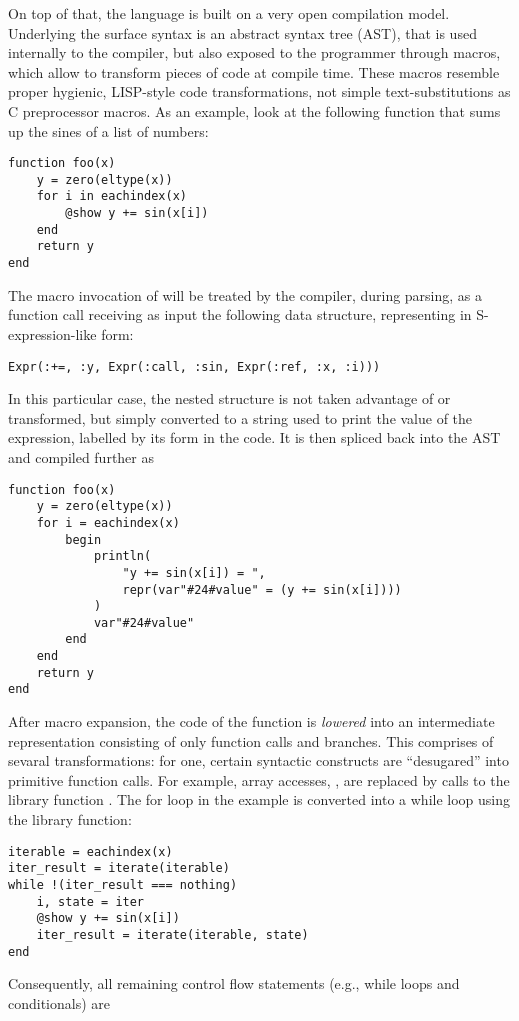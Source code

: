 On top of that, the language is built on a very open compilation model.  Underlying the surface
syntax is an abstract syntax tree (AST), that is used internally to the compiler, but also exposed
to the programmer through macros, which allow to transform pieces of code at compile time.  These
macros resemble proper hygienic, LISP-style code transformations, not simple text-substitutions as C
preprocessor macros.  As an example, look at the following function that sums up the sines of a list
of numbers:
\begin{lstlisting}
function foo(x)
    y = zero(eltype(x))
    for i in eachindex(x)
        @show y += sin(x[i])
    end
    return y
end
\end{lstlisting}
The macro invocation of  will be treated by the compiler, during parsing, as a function
call receiving as input the following data structure, representing  in
S-expression-like form:
\begin{lstlisting}
Expr(:+=, :y, Expr(:call, :sin, Expr(:ref, :x, :i)))
\end{lstlisting}
In this particular case, the nested structure is not taken advantage of or transformed, but simply
converted to a string used to print the value of the expression, labelled by its form in the code.
It is then spliced back into the AST and compiled further as
\begin{lstlisting}
function foo(x)
    y = zero(eltype(x))
    for i = eachindex(x)
        begin
            println(
                "y += sin(x[i]) = ",
                repr(var"#24#value" = (y += sin(x[i])))
            )
            var"#24#value"
        end
    end
    return y
end
\end{lstlisting}
After macro expansion, the code of the function is \emph{lowered} into an intermediate
representation consisting of only function calls and branches.  This comprises of sevaral
transformations: for one, certain syntactic constructs are \enquote{desugared} into primitive
function calls.  For example, array accesses, , are replaced by calls to the library
function .  The for loop in the example is converted into a while loop using
the  library function:
\begin{lstlisting}
iterable = eachindex(x)
iter_result = iterate(iterable)
while !(iter_result === nothing)
    i, state = iter
    @show y += sin(x[i])
    iter_result = iterate(iterable, state)
end
\end{lstlisting}
Consequently, all remaining control flow statements (e.g., while loops and conditionals) are
